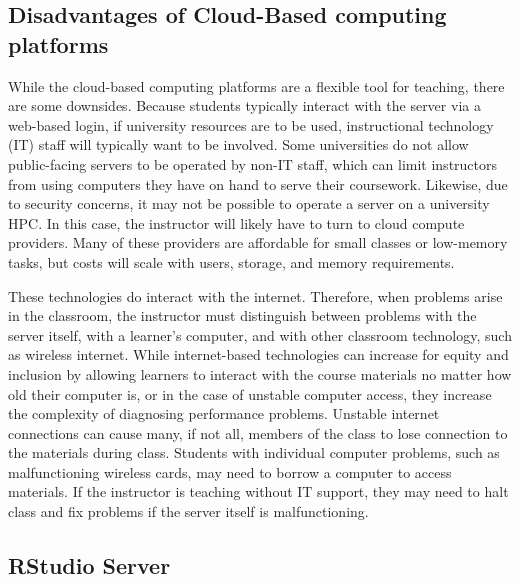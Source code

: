 \subsection{Disadvantages of Cloud-Based computing platforms}\label{subsub:cloud-disdvantage}

While the cloud-based computing platforms are a flexible tool for teaching, there are some downsides.
Because students typically interact with the server via a web-based login, if university resources are to be used, 
instructional technology (IT) staff will typically want to be involved.
Some universities do not allow public-facing servers to be operated by non-IT staff, which can 
limit instructors from using computers they have on hand to serve their coursework.
Likewise, due to security concerns, it may not be possible to operate a server on a university HPC.
In this case, the instructor will likely have to turn to cloud compute providers.
Many of these providers are affordable for small classes or low-memory tasks, but costs will scale with users, storage, and memory requirements.

These technologies do interact with the internet.
Therefore, when problems arise in the classroom, the instructor must distinguish between problems with the server itself, with a 
learner's computer, and with other classroom technology, such as wireless internet.
While internet-based technologies can increase for equity and inclusion by allowing learners to 
interact with the course materials no matter how old their computer is, or in the case of  unstable computer access, 
they increase the complexity of diagnosing performance problems.
Unstable internet connections can cause many, if not all, members of the class to lose connection to the materials during class.
Students with individual computer problems, such as malfunctioning wireless cards, may need to borrow a computer to access materials. 
If the instructor is teaching without IT support, they may need to halt class and fix problems if the server itself is malfunctioning.


\subsection{RStudio Server}\label{subsub:RStudio}

